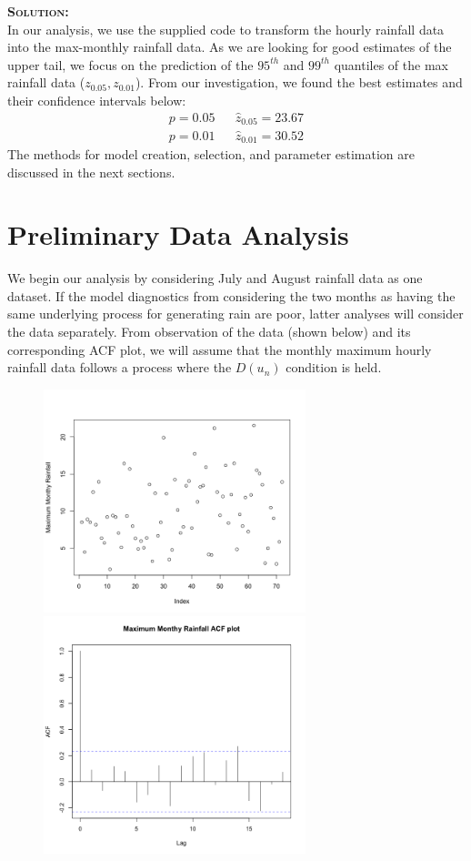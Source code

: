\documentclass[12pt,oneside]{article}
\newenvironment{solution}
    {\textbf{\textsc{Solution:}}\\}
    {\newpage}
\begin{document}
\begin{solution}
In our analysis, we use the supplied code to transform the hourly rainfall data into the max-monthly rainfall data. As we are looking for good estimates of the upper tail, we focus on the prediction of the $95^{th}$ and $99^{th}$ quantiles of the max rainfall data ($z_{0.05},z_{0.01}$). From our investigation, we found the best estimates and their confidence intervals below:
\begin{align*}
    p= 0.05  && \hat{z}_{0.05}=23.67 \\
    p= 0.01  && \hat{z}_{0.01}=30.52 
\end{align*}
The methods for model creation, selection, and parameter estimation are discussed in the next sections.
\section*{Preliminary Data Analysis}
We begin our analysis by considering July and August rainfall data as one dataset. If the model diagnostics from considering the two months as having the same underlying process for generating rain are poor, latter analyses will consider the data separately. From observation of the data (shown below) and its corresponding ACF plot, we will assume that the monthly maximum hourly rainfall data follows a process where the $D(u_n)$ condition is held. 
\begin{figure}[H]
\begin{center}
{\includegraphics[width=3in]{Assignments/a3/rain.png}}
{\includegraphics[width=3in]{Assignments/a3/rain-acf.png}}

\end{center}
\end{figure}
\end{solution}
\end{document}
